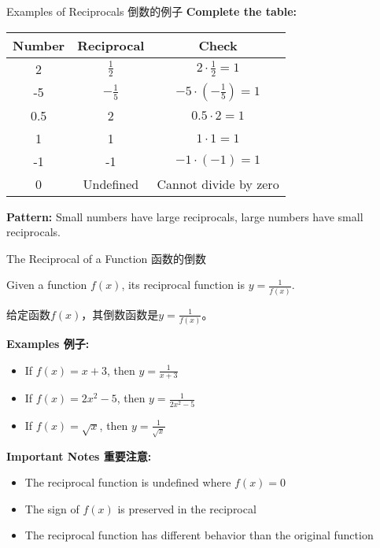 \documentclass[aspectratio=169]{beamer}
\begin{document}
\begin{frame}{Examples of Reciprocals 倒数的例子}
    \footnotesize
    \textbf{Complete the table:}
    \begin{center}
        \begin{tabular}{|c|c|c|}
            \hline
            \textbf{Number} & \textbf{Reciprocal} & \textbf{Check} \\
            \hline
            2 & $\frac{1}{2}$ & $2 \cdot \frac{1}{2} = 1$ \\
            \hline
            -5 & $-\frac{1}{5}$ & $-5 \cdot (-\frac{1}{5}) = 1$ \\
            \hline
            0.5 & 2 & $0.5 \cdot 2 = 1$ \\
            \hline
            1 & 1 & $1 \cdot 1 = 1$ \\
            \hline
            -1 & -1 & $-1 \cdot (-1) = 1$ \\
            \hline
            0 & Undefined & Cannot divide by zero \\
            \hline
        \end{tabular}
    \end{center}
    \vspace{1em}
    \textbf{Pattern:} Small numbers have large reciprocals, large numbers have small reciprocals.
\end{frame}

\begin{frame}{The Reciprocal of a Function 函数的倒数}
    \begin{tcolorbox}[colback=lightgray,colframe=primary,title=Definition 定义]
        \footnotesize
        Given a function $f(x)$, its reciprocal function is $y = \frac{1}{f(x)}$.
        \par
        给定函数$f(x)$，其倒数函数是$y = \frac{1}{f(x)}$。
    \end{tcolorbox}
    \vspace{1em}
    \textbf{Examples 例子:}
    \begin{itemize}
        \item If $f(x) = x + 3$, then $y = \frac{1}{x + 3}$
        \item If $f(x) = 2x^2 - 5$, then $y = \frac{1}{2x^2 - 5}$
        \item If $f(x) = \sqrt{x}$, then $y = \frac{1}{\sqrt{x}}$
    \end{itemize}
    \vspace{1em}
    \textbf{Important Notes 重要注意:}
    \begin{itemize}
        \item The reciprocal function is undefined where $f(x) = 0$
        \item The sign of $f(x)$ is preserved in the reciprocal
        \item The reciprocal function has different behavior than the original function
    \end{itemize}
\end{frame}
\end{document}
